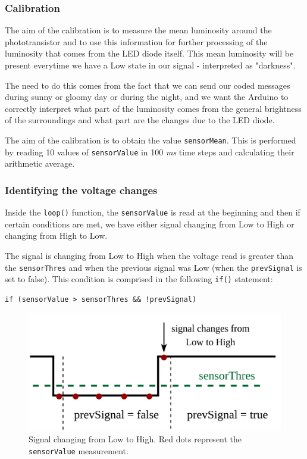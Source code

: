 \documentclass[12pt]{report}
\begin{document}
\subsubsection{Calibration}

The aim of the calibration is to measure the mean luminosity around the phototransistor and to use this information for further processing of the luminosity that comes from the LED diode itself. This mean luminosity will be present everytime we have a Low state in our signal - interpreted as "darkness".

The need to do this comes from the fact that we can send our coded messages during sunny or gloomy day or during the night, and we want the Arduino to correctly interpret what part of the luminosity comes from the general brightness of the surroundings and what part are the changes due to the LED diode.

The aim of the calibration is to obtain the value \verb|sensorMean|. This is performed by reading 10 values of \verb|sensorValue| in 100 \textit{ms} time steps and calculating their arithmetic average.

\subsubsection{Identifying the voltage changes}

Inside the \verb|loop()| function, the \verb|sensorValue| is read at the beginning and then if certain conditions are met, we have either signal changing from Low to High or changing from High to Low.

The signal is changing from Low to High when the voltage read is greater than the \verb|sensorThres| and when the previous signal was Low (when the \verb|prevSignal| is set to false). This condition is comprised in the following \verb|if()| statement:

\begin{lstlisting}
if (sensorValue > sensorThres && !prevSignal)
\end{lstlisting}

\begin{figure}[H]
\centering\includegraphics[scale=0.18]{lowtohigh}
\caption{Signal changing from Low to High. Red dots represent the \texttt{sensorValue} measurement.}				
\label{fig:arduino_code}
\end{figure}
\end{document}
